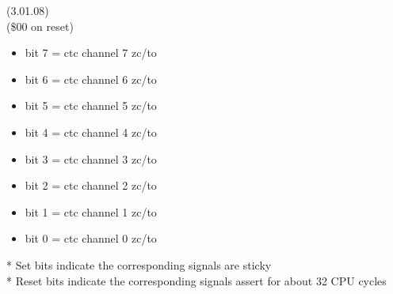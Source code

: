  (3.01.08)\\
(\$00 on reset)
\begin{itemize}
\item bit 7 = ctc channel 7 zc/to
\item bit 6 = ctc channel 6 zc/to
\item bit 5 = ctc channel 5 zc/to
\item bit 4 = ctc channel 4 zc/to
\item bit 3 = ctc channel 3 zc/to
\item bit 2 = ctc channel 2 zc/to
\item bit 1 = ctc channel 1 zc/to
\item bit 0 = ctc channel 0 zc/to
\end{itemize}
* Set bits indicate the corresponding signals are sticky\\
* Reset bits indicate the corresponding signals assert for about 32 CPU cycles
